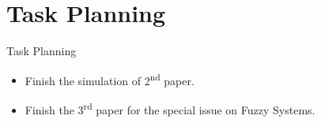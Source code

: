 \documentclass[10pt]{beamer}
\begin{document}
\section{Task Planning}
\begin{frame}{Task Planning}
    \begin{itemize}
      \item Finish the simulation of 2\textsuperscript{nd} paper.
      \item Finish the 3\textsuperscript{rd} paper for the special issue on Fuzzy Systems.
    \end{itemize}
\end{frame}
\end{document}
